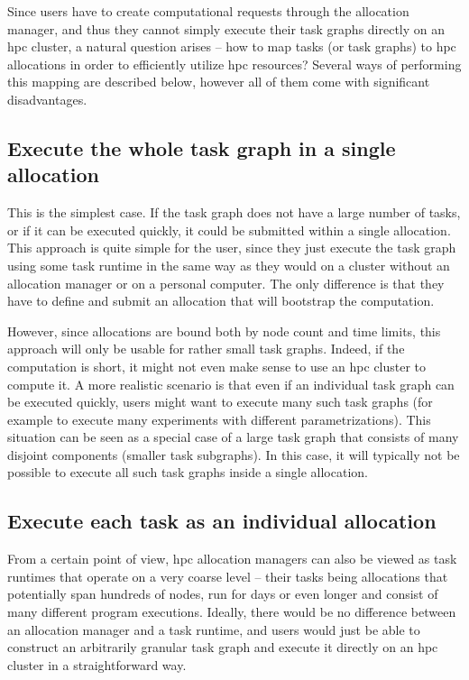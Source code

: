 Since users have to create computational requests through the allocation manager, and thus they
cannot simply execute their task graphs directly on an \gls{hpc} cluster, a
natural question arises -- how to map tasks (or task graphs) to \gls{hpc}
allocations in order to efficiently utilize \gls{hpc} resources? Several ways of
performing this mapping are described below, however all of them come with significant
disadvantages.

\subsection*{Execute the whole task graph in a single allocation} This is the simplest case. If the
task graph does not have a large number of tasks, or if it can be executed quickly, it could be
submitted within a single allocation. This approach is quite simple for the user, since they just
execute the task graph using some task runtime in the same way as they would on a cluster without
an allocation manager or on a personal computer. The only difference is that they have to define
and submit an allocation that will bootstrap the computation.

However, since allocations are bound both by node count and time limits, this approach will only be
usable for rather small task graphs. Indeed, if the computation is short, it might not even make
sense to use an \gls{hpc} cluster to compute it. A more realistic scenario is that
even if an individual task graph can be executed quickly, users might want to execute many such
task graphs (for example to execute many experiments with different parametrizations). This
situation can be seen as a special case of a large task graph that consists of many disjoint
components (smaller task subgraphs). In this case, it will typically not be possible to execute all
such task graphs inside a single allocation.

\subsection*{Execute each task as an individual allocation} From a certain point of view, \gls{hpc}
allocation managers can also be viewed as task runtimes that operate on a very coarse level --
their tasks being allocations that potentially span hundreds of nodes, run for days or even longer
and consist of many different program executions. Ideally, there would be no difference between an
allocation manager and a task runtime, and users would just be able to construct an arbitrarily
granular task graph and execute it directly on an \gls{hpc} cluster in a
straightforward way.

